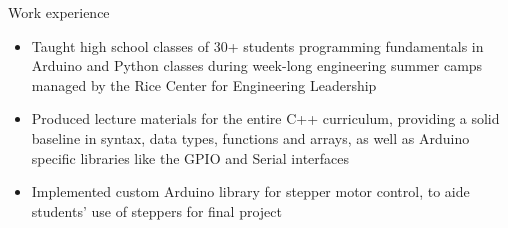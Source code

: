 \documentclass{resume}
\begin{document}
\begin{experienceSection}{Work experience}
\begin{itemize}
    \end{itemize}
    \experienceItem[
        company={Rice ELITE Tech Camp},
        location={Houston, TX},
        position={Robotics Programming Instructor},
        duration={May 2025 – July 2025}
    ]
    \begin{itemize}
        \vspace{-0.2em}
        \itemsep -6pt
        \item Taught high school classes of 30+ students programming fundamentals in Arduino and Python classes during week-long engineering summer camps managed by the Rice Center for Engineering Leadership
        \item Produced lecture materials for the entire C++ curriculum, providing a solid baseline in syntax, data types, functions and arrays, as well as Arduino specific libraries like the GPIO and Serial interfaces
        \item Implemented custom Arduino library for stepper motor control, to aide students’ use of steppers for final project
    \end{itemize}
\end{experienceSection}
\end{document}
